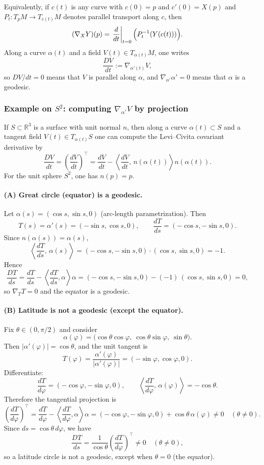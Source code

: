 \documentclass[12pt,a4paper]{article}
\theoremstyle{plain}
\theoremstyle{definition}      %
\begin{document}
	Equivalently, if $c(t)$ is any curve with $c(0)=p$ and $c'(0)=X(p)$ and $P_t:T_pM\to T_{c(t)}M$ denotes parallel
	transport along $c$, then
	\[
	(\nabla_XY)(p)
	=
	\left.\frac{d}{dt}\right|_{t=0}\Bigl(P_t^{-1}(Y(c(t)))\Bigr).
	\]
	Along a curve $\alpha(t)$ and a field $V(t)\in T_{\alpha(t)}M$, one writes
	\[
	\frac{DV}{dt}:=\nabla_{\alpha'(t)}V,
	\]
	so $DV/dt=0$ means that $V$ is parallel along $\alpha$, and $\nabla_{\alpha'}\alpha'=0$ means that $\alpha$ is a
	geodesic.
	
	\subsubsection*{Example on $S^2$: computing $\nabla_{\alpha'}V$ by projection}
	
	If $S\subset\mathbb{R}^3$ is a surface with unit normal $n$, then along a curve $\alpha(t)\subset S$ and a tangent
	field $V(t)\in T_{\alpha(t)}S$ one can compute the Levi--Civita covariant derivative by
	\[
	\frac{DV}{dt}=\left(\frac{dV}{dt}\right)^\top
	=
	\frac{dV}{dt}-\left\langle \frac{dV}{dt},\,n(\alpha(t))\right\rangle n(\alpha(t)).
	\]
	For the unit sphere $S^2$, one has $n(p)=p$.
	
	\paragraph{(A) Great circle (equator) is a geodesic.}
	Let $\alpha(s)=(\cos s,\sin s,0)$ (arc-length parametrization). Then
	\[
	T(s)=\alpha'(s)=(-\sin s,\cos s,0),\qquad \frac{dT}{ds}=(-\cos s,-\sin s,0).
	\]
	Since $n(\alpha(s))=\alpha(s)$,
	\[
	\left\langle \frac{dT}{ds},\,\alpha(s)\right\rangle
	= (-\cos s,-\sin s,0)\cdot(\cos s,\sin s,0)=-1.
	\]
	Hence
	\[
	\frac{DT}{ds}
	=
	\frac{dT}{ds}-\left\langle \frac{dT}{ds},\alpha\right\rangle\alpha
	=
	(-\cos s,-\sin s,0)-(-1)\,(\cos s,\sin s,0)=0,
	\]
	so $\nabla_TT=0$ and the equator is a geodesic.
	
	\paragraph{(B) Latitude is not a geodesic (except the equator).}
	Fix $\theta\in(0,\pi/2)$ and consider
	\[
	\alpha(\varphi)=\bigl(\cos\theta\cos\varphi,\ \cos\theta\sin\varphi,\ \sin\theta\bigr).
	\]
	Then $|\alpha'(\varphi)|=\cos\theta$, and the unit tangent is
	\[
	T(\varphi)=\frac{\alpha'(\varphi)}{|\alpha'(\varphi)|}=(-\sin\varphi,\cos\varphi,0).
	\]
	Differentiate:
	\[
	\frac{dT}{d\varphi}=(-\cos\varphi,-\sin\varphi,0),
	\qquad
	\left\langle \frac{dT}{d\varphi},\,\alpha(\varphi)\right\rangle=-\cos\theta.
	\]
	Therefore the tangential projection is
	\[
	\left(\frac{dT}{d\varphi}\right)^\top
	=
	\frac{dT}{d\varphi}-\left\langle \frac{dT}{d\varphi},\alpha\right\rangle\alpha
	=
	(-\cos\varphi,-\sin\varphi,0)+\cos\theta\,\alpha(\varphi)\neq 0
	\quad(\theta\neq 0).
	\]
	Since $ds=\cos\theta\,d\varphi$, we have
	\[
	\frac{DT}{ds}=\frac{1}{\cos\theta}\left(\frac{dT}{d\varphi}\right)^\top\neq 0\quad(\theta\neq 0),
	\]
	so a latitude circle is not a geodesic, except when $\theta=0$ (the equator).
	
\end{document}
